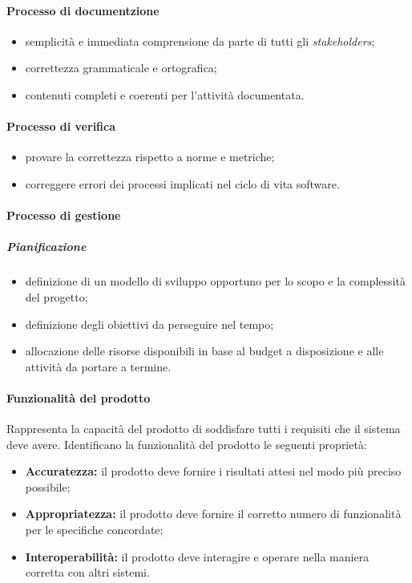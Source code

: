 \paragraph{Processo di documentzione}
\begin{itemize}
	\item semplicità e immediata comprensione da parte di tutti gli \textit{stakeholders\glo};
	\item correttezza grammaticale e ortografica;
	\item contenuti completi e coerenti per l'attività documentata.
\end{itemize}

\paragraph{Processo di verifica}
\begin{itemize}
	\item provare la correttezza rispetto a norme e metriche;
	\item correggere errori dei processi implicati nel ciclo di vita software.
\end{itemize}

\paragraph{Processo di gestione}
\subparagraph*{Pianificazione}
\begin{itemize}
	\item definizione di un modello di sviluppo opportuno per lo scopo e la complessità del progetto;
	\item definizione degli obiettivi da perseguire nel tempo;
	\item allocazione delle risorse disponibili in base al budget a disposizione e alle attività da portare a termine.
\end{itemize}

\paragraph{Funzionalità del prodotto}
Rappresenta la capacità del prodotto di soddisfare tutti i requisiti che il sistema deve avere. Identificano la funzionalità del prodotto le seguenti proprietà:
\begin{itemize}
	\item \textbf{Accuratezza:} il prodotto deve fornire i risultati attesi nel modo più preciso possibile;
	\item \textbf{Appropriatezza:} il prodotto deve fornire il corretto numero di funzionalità per le specifiche concordate;
	\item \textbf{Interoperabilità:} il prodotto deve interagire e operare nella maniera corretta con altri sistemi.
\end{itemize}

